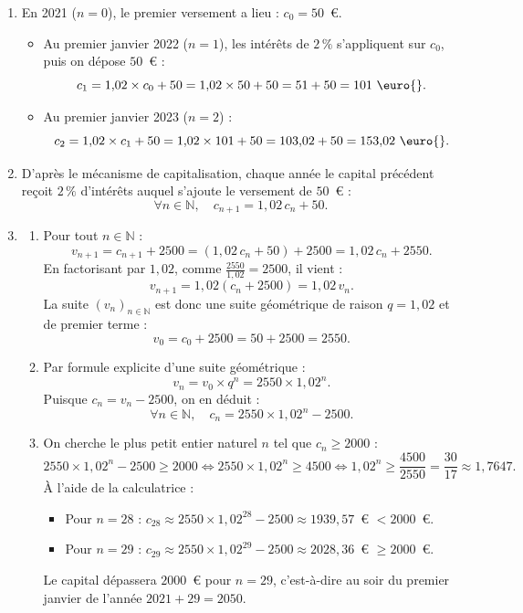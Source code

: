 \documentclass[11pt,a4paper]{article}
\newcommand{\N}{\mathbb{N}}
\begin{document}
\begin{correctionbox}
\begin{enumerate}
    \item En 2021 ($n=0$), le premier versement a lieu : $c_0 = 50$~\euro{}.
    \begin{itemize}
        \item Au premier janvier 2022 ($n=1$), les intérêts de $2\,\%$ s'appliquent sur $c_0$, puis on dépose $50$~\euro{} :
        \[
        c_1 = 1{,}02 \times c_0 + 50 = 1{,}02 \times 50 + 50 = 51 + 50 = 101\text{~\euro{}}.
        \]
        \item Au premier janvier 2023 ($n=2$) :
        \[
        c_2 = 1{,}02 \times c_1 + 50 = 1{,}02 \times 101 + 50 = 103{,}02 + 50 = 153{,}02\text{~\euro{}}.
        \]
    \end{itemize}
    \item D'après le mécanisme de capitalisation, chaque année le capital précédent reçoit $2\,\%$ d'intérêts auquel s'ajoute le versement de $50$~\euro{} :
    \[
    \forall n \in \N, \quad c_{n+1} = 1{,}02 \, c_n + 50.
    \]
    \item
    \begin{enumerate}
        \item Pour tout $n \in \N$ :
        \[
        v_{n+1} = c_{n+1} + 2500 = (1{,}02 \, c_n + 50) + 2500 = 1{,}02 \, c_n + 2550.
        \]
        En factorisant par $1{,}02$, comme $\frac{2550}{1{,}02} = 2500$, il vient :
        \[
        v_{n+1} = 1{,}02(c_n + 2500) = 1{,}02 \, v_n.
        \]
        La suite $(v_n)_{n \in \N}$ est donc une suite géométrique de raison $q = 1{,}02$ et de premier terme :
        \[
        v_0 = c_0 + 2500 = 50 + 2500 = 2550.
        \]
        \item Par formule explicite d'une suite géométrique :
        \[
        v_n = v_0 \times q^n = 2550 \times 1{,}02^n.
        \]
        Puisque $c_n = v_n - 2500$, on en déduit :
        \[
        \forall n \in \N, \quad c_n = 2550 \times 1{,}02^n - 2500.
        \]
        \item On cherche le plus petit entier naturel $n$ tel que $c_n \ge 2000$ :
        \[
        2550 \times 1{,}02^n - 2500 \ge 2000 \iff 2550 \times 1{,}02^n \ge 4500 \iff 1{,}02^n \ge \frac{4500}{2550} = \frac{30}{17} \approx 1{,}7647.
        \]
        À l'aide de la calculatrice :
        \begin{itemize}
            \item Pour $n = 28$ : $c_{28} \approx 2550 \times 1{,}02^{28} - 2500 \approx 1939{,}57$~\euro{} $< 2000$~\euro{}.
            \item Pour $n = 29$ : $c_{29} \approx 2550 \times 1{,}02^{29} - 2500 \approx 2028{,}36$~\euro{} $\ge 2000$~\euro{}.
        \end{itemize}
        Le capital dépassera $2000$~\euro{} pour $n = 29$, c'est-à-dire au soir du premier janvier de l'année $2021 + 29 = 2050$.
    \end{enumerate}
\end{enumerate}
\end{correctionbox}
\end{document}
